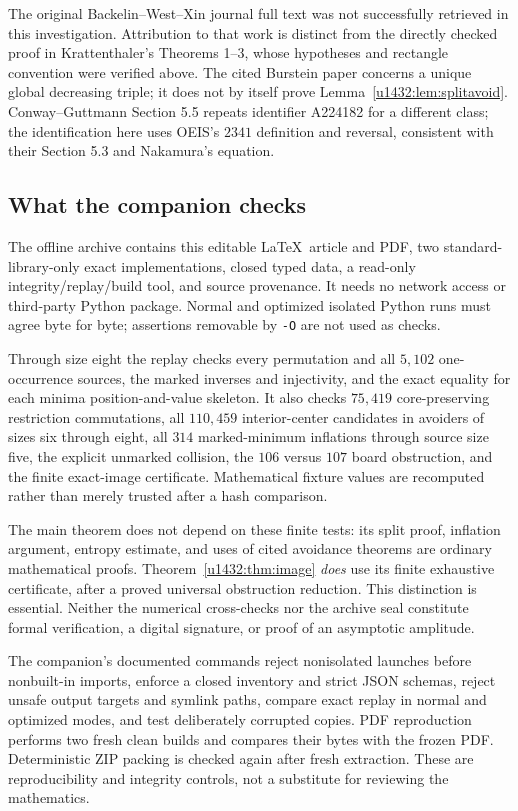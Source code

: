 \documentclass[11pt]{article}
\theoremstyle{remark}\newtheorem{remark}[theorem]{Remark}
\begin{document}
The original Backelin--West--Xin journal full text was not successfully
retrieved in this investigation. Attribution to that work is distinct
from the directly checked proof in Krattenthaler's Theorems 1--3, whose
hypotheses and rectangle convention were verified above. The cited
Burstein paper concerns a unique global decreasing triple; it does not
by itself prove Lemma~\ref{u1432:lem:splitavoid}. Conway--Guttmann Section 5.5
repeats identifier A224182 for a different class; the identification here
uses OEIS's $2341$ definition and reversal, consistent with their
Section 5.3 and Nakamura's equation.

\subsection{What the companion checks}
The offline archive contains this editable \LaTeX\ article and PDF,
two standard-library-only exact implementations, closed typed data,
a read-only integrity/replay/build tool, and source provenance. It needs
no network access or third-party Python package. Normal and optimized
isolated Python runs must agree byte for byte; assertions removable by
\texttt{-O} are not used as checks.

Through size eight the replay checks every permutation and all $5{,}102$
one-occurrence sources, the marked inverses and injectivity, and the
exact equality for each minima position-and-value skeleton. It also
checks $75{,}419$ core-preserving restriction commutations, all $110{,}459$
interior-center candidates in avoiders of sizes six through eight, all $314$
marked-minimum inflations through source size five, the explicit
unmarked collision, the $106$ versus $107$ board obstruction, and the
finite exact-image certificate. Mathematical fixture values are
recomputed rather than merely trusted after a hash comparison.

The main theorem does not depend on these finite tests: its split proof,
inflation argument, entropy estimate, and uses of cited avoidance
theorems are ordinary mathematical proofs. Theorem~\ref{u1432:thm:image}
\emph{does} use its finite exhaustive certificate, after a proved
universal obstruction reduction. This distinction is essential. Neither
the numerical cross-checks nor the archive seal constitute formal
verification, a digital signature, or proof of an asymptotic amplitude.

The companion's documented commands reject nonisolated launches before
nonbuilt-in imports, enforce a closed inventory and strict JSON schemas,
reject unsafe output targets and symlink paths, compare exact replay in
normal and optimized modes, and test deliberately corrupted copies.
PDF reproduction performs two fresh clean builds and compares their bytes
with the frozen PDF. Deterministic ZIP packing is checked again after
fresh extraction. These are reproducibility and integrity controls,
not a substitute for reviewing the mathematics.
\end{document}
